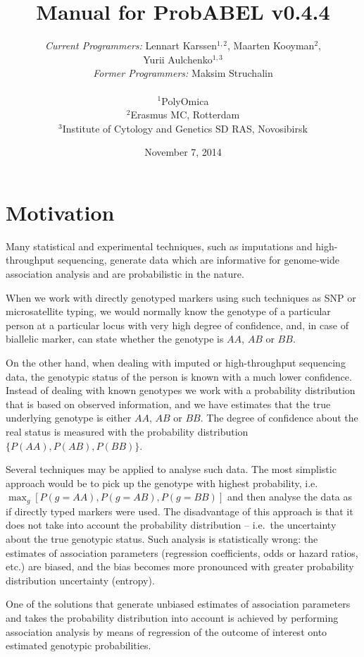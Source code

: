 \documentclass[12pt,a4paper]{article}
\title{Manual for ProbABEL v0.4.4}
\author{\emph{Current Programmers:} Lennart Karssen$^{1,2}$, Maarten
  Kooyman$^2$, \\
  Yurii Aulchenko$^{1,3}$ \\
  \emph{Former Programmers:} Maksim Struchalin
  \\
  \\
  $^{1}${\small PolyOmica} \\
  $^{2}${\small Erasmus MC, Rotterdam}\\
  $^{3}${\small Institute of Cytology and Genetics SD RAS, Novosibirsk}
}
\date{November 7, 2014}
\begin{document}
\maketitle
\tableofcontents


\section{Motivation}

Many statistical and experimental techniques, such as imputations and
high-throughput sequencing, generate data which are informative for
genome-wide association analysis and are probabilistic in the nature.

When we work with directly genotyped markers using such techniques as
SNP or microsatellite typing, we would normally know the genotype of
a particular person at a particular locus with very high degree of
confidence, and, in case of biallelic marker, can state whether
the genotype is $AA$, $AB$ or $BB$.

On the other hand, when dealing with imputed or high-throughput
sequencing data, the genotypic status of the person is known with a
much lower confidence. Instead of dealing with
known genotypes we work with a probability distribution that is based
on observed information, and we have estimates that the true underlying
genotype is either $AA$, $AB$ or $BB$. The degree of confidence about
the real status is measured with the probability distribution
$\{P(AA), P(AB), P(BB)\}$.

Several techniques may be applied to analyse such data. The most
simplistic approach would be to pick up the genotype with highest
probability, i.e.~$\max_g[P(g=AA), P(g=AB), P(g=BB)]$ and then
analyse the data as if directly typed markers were used. The
disadvantage of this approach is that it does not take into
account the probability distribution -- i.e.~the uncertainty
about the true genotypic status. Such
analysis is statistically wrong: the estimates of association
parameters (regression coefficients, odds or hazard ratios, etc.)
are biased, and the bias becomes more pronounced with greater
probability distribution uncertainty (entropy).

One of the solutions that generate unbiased estimates
of association parameters and takes the
probability distribution into account is achieved by
performing association analysis by means of regression of the
outcome of interest onto estimated genotypic probabilities.
\end{document}
